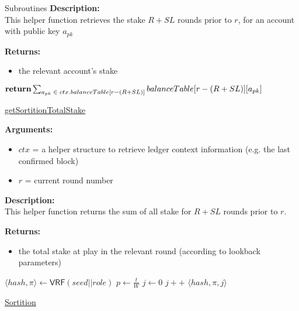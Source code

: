 \documentclass[10pt,a4paper]{article}
\begin{document}
\begin{section}{Subroutines}
\noindent \textbf{Description:}\\
This helper function retrieves the stake $R + SL$ rounds prior to $r$, for an account
with public key $a_{pk}$

\noindent \textbf{Returns:}
\begin{itemize}
    \item the relevant account's stake
  \end{itemize}




\begin{algorithm}[H]
    \begin{algorithmic}[1]
        
        $\Return \sum_{a_{pk}\;\in\;ctx.balanceTable[r - (R + SL)]}{balanceTable[r - (R + SL)][a_{pk}]}$

        \EndFunction
    \end{algorithmic}
    \caption{\underline{getSortitionTotalStake}}
\end{algorithm}

\noindent \textbf{Arguments:}
\begin{itemize}
    \item $ctx$ = a helper structure to retrieve ledger context information (e.g. the last confirmed block)
    \item $r$ = current round number
  \end{itemize}


\noindent \textbf{Description:}\\
This helper function returns the sum of all stake for $R + SL$ rounds prior to $r$.

\noindent \textbf{Returns:}
\begin{itemize}
    \item the total stake at play in the relevant round (according to lookback parameters)
  \end{itemize}


\begin{algorithm}[H]
    \begin{algorithmic}[1]
        \State $ \langle hash, \pi \rangle \gets \mathsf{VRF}(seed||role)$
        \State $p \gets \frac{t}{W}$
        \State $j \gets 0$
        \While{$\frac{hash}{2^{hashlen}}\notin [ \sum_{k=0}^j\mathsf{B}(k;w,p), \sum_{k=0}^{j+1}\mathsf{B}(k;w,p))$}
            \State $j++$
        \EndWhile
        \Return $ \langle hash,\pi,j \rangle$
    \EndFunction
    \end{algorithmic}
    \caption{\underline{Sortition}}
\end{algorithm}



\end{section}
\end{document}
